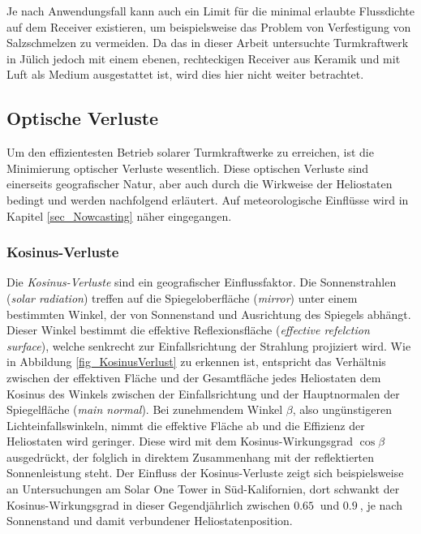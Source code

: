 Je nach Anwendungsfall kann auch ein Limit für die minimal erlaubte Flussdichte auf dem Receiver existieren, um beispielsweise das Problem von Verfestigung von Salzschmelzen zu vermeiden.
Da das in dieser Arbeit untersuchte Turmkraftwerk in Jülich jedoch mit einem ebenen, rechteckigen Receiver aus Keramik und mit Luft als Medium ausgestattet ist, wird dies hier nicht weiter betrachtet.

\subsection{Optische Verluste} \label{subsec_OptischeVerluste}
Um den effizientesten Betrieb solarer Turmkraftwerke zu erreichen, ist die Minimierung optischer Verluste wesentlich.
Diese optischen Verluste sind einerseits geografischer Natur, aber auch durch die Wirkweise der Heliostaten bedingt und werden nachfolgend erläutert.
Auf meteorologische Einflüsse wird in Kapitel \ref{sec_Nowcasting} näher eingegangen.

\subsubsection*{Kosinus-Verluste} \label{subsubsec_KosinusVerluste}
Die \textit{Kosinus-Verluste} sind ein geografischer Einflussfaktor.
Die Sonnenstrahlen (\textit{solar radiation}) treffen auf die Spiegeloberfläche (\textit{mirror}) unter einem bestimmten Winkel, der von Sonnenstand und Ausrichtung des Spiegels abhängt.
Dieser Winkel bestimmt die effektive Reflexionsfläche (\textit{effective refelction surface}), welche senkrecht zur Einfallsrichtung der Strahlung projiziert wird.
Wie in Abbildung \ref{fig_KosinusVerlust} zu erkennen ist, entspricht das Verhältnis zwischen der effektiven Fläche und der Gesamtfläche jedes Heliostaten dem Kosinus des Winkels zwischen der Einfallsrichtung und der Hauptnormalen der Spiegelfläche (\textit{main normal}).
Bei zunehmendem Winkel $\beta$, also ungünstigeren Lichteinfallswinkeln, nimmt die effektive Fläche ab und die Effizienz der Heliostaten wird geringer.
Diese wird mit dem Kosinus-Wirkungsgrad $\cos\beta$ ausgedrückt, der folglich in direktem Zusammenhang mit der reflektierten Sonnenleistung steht.
Der Einfluss der Kosinus-Verluste zeigt sich beispielsweise an Untersuchungen am Solar One Tower in Süd-Kalifornien, dort schwankt der Kosinus-Wirkungsgrad in dieser Gegend\linebreak jährlich zwischen $\SI{0.65}{}$ und $\SI{0.9}{}$, je nach Sonnenstand und damit verbundener Heliostatenposition. \cite{Holl}

